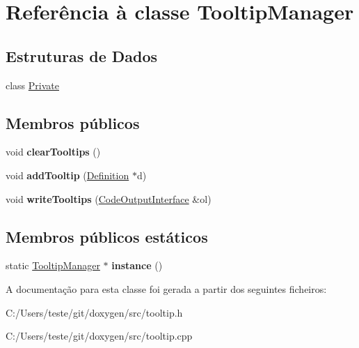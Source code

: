 \hypertarget{class_tooltip_manager}{\section{Referência à classe Tooltip\-Manager}
\label{class_tooltip_manager}
}
\subsection*{Estruturas de Dados}
\begin{DoxyCompactItemize}
\item 
class \hyperlink{class_tooltip_manager_1_1_private}{Private}
\end{DoxyCompactItemize}
\subsection*{Membros públicos}
\begin{DoxyCompactItemize}
\item 
\hypertarget{class_tooltip_manager_ad3104de6ef47a4e4a48626f48f08b113}{void {\bfseries clear\-Tooltips} ()}\label{class_tooltip_manager_ad3104de6ef47a4e4a48626f48f08b113}

\item 
\hypertarget{class_tooltip_manager_adc556eff75a089574867a8dc54aa6e36}{void {\bfseries add\-Tooltip} (\hyperlink{class_definition}{Definition} $\ast$d)}\label{class_tooltip_manager_adc556eff75a089574867a8dc54aa6e36}

\item 
\hypertarget{class_tooltip_manager_a2b733c7ee29f99e6e85757e56e593ae4}{void {\bfseries write\-Tooltips} (\hyperlink{class_code_output_interface}{Code\-Output\-Interface} \&ol)}\label{class_tooltip_manager_a2b733c7ee29f99e6e85757e56e593ae4}

\end{DoxyCompactItemize}
\subsection*{Membros públicos estáticos}
\begin{DoxyCompactItemize}
\item 
\hypertarget{class_tooltip_manager_a240bf919f58becc3e641adde8dc99095}{static \hyperlink{class_tooltip_manager}{Tooltip\-Manager} $\ast$ {\bfseries instance} ()}\label{class_tooltip_manager_a240bf919f58becc3e641adde8dc99095}

\end{DoxyCompactItemize}


A documentação para esta classe foi gerada a partir dos seguintes ficheiros\-:\begin{DoxyCompactItemize}
\item 
C\-:/\-Users/teste/git/doxygen/src/tooltip.\-h\item 
C\-:/\-Users/teste/git/doxygen/src/tooltip.\-cpp\end{DoxyCompactItemize}
